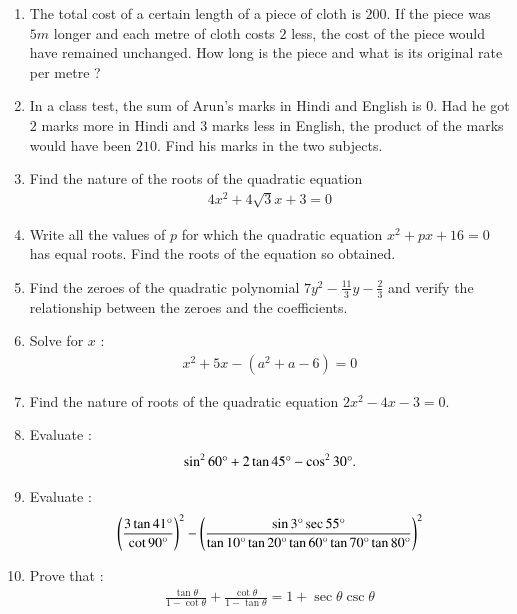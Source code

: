 \documentclass[2pt,-letter paper]{article}
\providecommand{\brak}[1]{\ensuremath{\left(#1\right)}}
\begin{document}
\begin{enumerate}
\item The total cost of a certain length of a piece of cloth is {\rupee$200$}. If the piece was $5 m$ longer and each metre of cloth costs {\rupee $2$ less}, the cost of the piece would have remained unchanged. How long is the piece and what is its original rate per metre ?

\item In a class test, the sum of Arun's marks in Hindi and English is $0$. Had he got $2$ marks more in Hindi and $3$ marks less in English, the product of the marks would have been $210$. Find his marks in the two subjects. 

\item Find the nature of the roots of the quadratic equation 
 \begin{align*}
 4x^2 + 4\sqrt{3}x +3= 0 
 \end{align*}

 \item Write all the values of $p$ for which the quadratic equation $x^2 + px + 16 = 0$ has equal roots. Find the roots of the equation so obtained.

\item Find the zeroes of the quadratic polynomial $7y^2 -\frac{11}{3}y -\frac{2}{3}$ and verify the relationship between the zeroes and the coefficients.

\item Solve for $x$ :
\begin{align*}
x^2+5x-\brak{a^2 +a -6}=0
\end{align*}

\item Find the nature of roots of the quadratic equation $2x^2-4x-3=0$.

\item Evaluate :
 \begin{align*}
	     \sin^{2}{60\degree} + 2\tan{45\degree} - \cos^{2}{30\degree}. 
      \end{align*}

\item Evaluate :
\begin{align*}
\left(\frac{3\tan 41\degree}{\cot 90\degree}\right)^2 - \left(\frac{\sin 3\degree \sec 55\degree}{\tan 10\degree \tan 20\degree \tan 60\degree \tan 70\degree \tan 80\degree}\right)^2
\end{align*}

\item Prove that :
\begin{align*}
\frac{\tan \theta}{1-\cot \theta} + \frac{\cot \theta}{1- \tan \theta} = 1+ \sec \theta  \csc  \theta   
\end{align*}


\end{enumerate}
\end{document}
